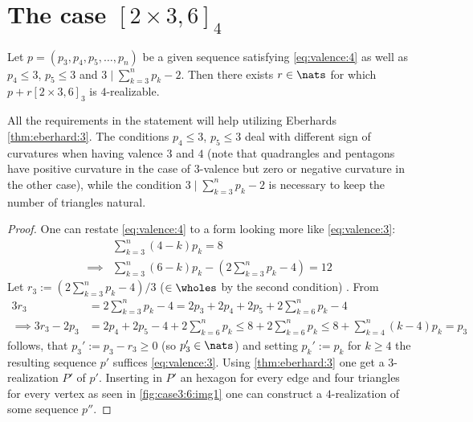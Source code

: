 \section{The case $[2 \times 3, 6]_4$}
\begin{lemma}
  Let $p = (p_3, p_4, p_5, \dots, p_n)$ be a given sequence satisfying \autoref{eq:valence:4} as well as $p_4 \leq 3$, $p_5 \leq 3$ and $3 \mid \sum_{k=3}^{n} p_k - 2$. Then there exists $r \in \nats$ for which $p + r [2 \times 3, 6]_3$ is $4$-realizable.

  All the requirements in the statement will help utilizing Eberhards \autoref{thm:eberhard:3}. The conditions $p_4 \leq 3$, $p_5 \leq 3$ deal with different sign of curvatures when having valence $3$ and $4$ (note that quadrangles and pentagons have positive curvature in the case of $3$-valence but zero or negative curvature in the other case), while the condition $3 \mid \sum_{k=3}^{n} p_k - 2$ is necessary to keep the number of triangles natural. 
  \begin{proof}
    One can restate \autoref{eq:valence:4} to a form looking more like \autoref{eq:valence:3}:
    \begin{align*}
      & \sum_{k=3}^n \left( 4 - k \right) p_k = 8 \\
      \implies & \sum_{k=3}^n \left( 6 - k \right) p_k - \left(2 \sum_{k=3}^n  p_k - 4 \right) = 12
    \end{align*}
    Let $r_3 := (2 \sum_{k=3}^{n} p_k - 4)/3$ ($\in \wholes$ by the second condition) . From
    \begin{align*}
      3 r_3 &= 2 \sum_{k=3}^{n} p_k - 4 =  2 p_3 + 2 p_4 + 2 p_5 + 2 \sum_{k=6}^{n} p_k - 4\\
      \implies 3 r_3 - 2 p_3 &= 2 p_4 + 2 p_5 - 4 + 2 \sum_{k=6}^{n} p_k \leq 8 + 2 \sum_{k=6}^{n} p_k \leq 8 + \sum_{k=4}^{n} (k - 4) p_k = p_3
    \end{align*}
    follows, that $p_3' := p_3 - r_3 \geq 0$ (so $p'_3 \in \nats$) and setting $p_k' := p_k$ for $k \geq 4$ the resulting sequence $p'$ suffices \autoref{eq:valence:3}. Using \autoref{thm:eberhard:3} one get a $3$-realization $P'$ of $p'$. Inserting in $P'$ an hexagon for every edge and four triangles for every vertex as seen in \autoref{fig:case3:6:img1} one can construct a $4$-realization of some sequence $p''$.
    

\end{proof}
\end{lemma}
